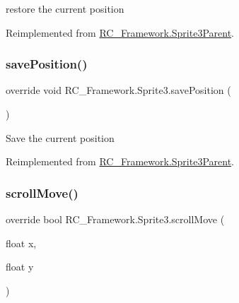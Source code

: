 restore the current position 



Reimplemented from \mbox{\hyperlink{class_r_c___framework_1_1_sprite3_parent_ad67b46aec70ebe4a720dc4550108b8c1}{R\+C\+\_\+\+Framework.\+Sprite3\+Parent}}.

\mbox{\label{class_r_c___framework_1_1_sprite3_ae4733340c18c8098b250418081020c6a}} 
\subsubsection{\texorpdfstring{save\+Position()}{savePosition()}}
{\footnotesize\ttfamily override void R\+C\+\_\+\+Framework.\+Sprite3.\+save\+Position (\begin{DoxyParamCaption}{ }\end{DoxyParamCaption})\hspace{0.3cm}{\ttfamily [virtual]}}



Save the current position 



Reimplemented from \mbox{\hyperlink{class_r_c___framework_1_1_sprite3_parent_ad934c0f7664064c6ac89525bf06516fc}{R\+C\+\_\+\+Framework.\+Sprite3\+Parent}}.

\mbox{\label{class_r_c___framework_1_1_sprite3_ab4c64556d7bcebf5ce538631ae9b5d6c}} 
\subsubsection{\texorpdfstring{scroll\+Move()}{scrollMove()}}
{\footnotesize\ttfamily override bool R\+C\+\_\+\+Framework.\+Sprite3.\+scroll\+Move (\begin{DoxyParamCaption}\item[{float}]{x,  }\item[{float}]{y }\end{DoxyParamCaption})\hspace{0.3cm}{\ttfamily [virtual]}}



